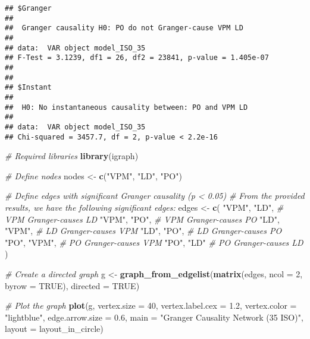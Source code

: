 \documentclass[
]{article}
\newenvironment{Shaded}{\begin{snugshade}}{\end{snugshade}}
\newcommand{\AttributeTok}[1]{\textcolor[rgb]{0.13,0.29,0.53}{#1}}
\newcommand{\CommentTok}[1]{\textcolor[rgb]{0.56,0.35,0.01}{\textit{#1}}}
\newcommand{\ConstantTok}[1]{\textcolor[rgb]{0.56,0.35,0.01}{#1}}
\newcommand{\DecValTok}[1]{\textcolor[rgb]{0.00,0.00,0.81}{#1}}
\newcommand{\FloatTok}[1]{\textcolor[rgb]{0.00,0.00,0.81}{#1}}
\newcommand{\FunctionTok}[1]{\textcolor[rgb]{0.13,0.29,0.53}{\textbf{#1}}}
\newcommand{\NormalTok}[1]{#1}
\newcommand{\OtherTok}[1]{\textcolor[rgb]{0.56,0.35,0.01}{#1}}
\newcommand{\StringTok}[1]{\textcolor[rgb]{0.31,0.60,0.02}{#1}}
\begin{document}
\begin{verbatim}
## $Granger
## 
##  Granger causality H0: PO do not Granger-cause VPM LD
## 
## data:  VAR object model_ISO_35
## F-Test = 3.1239, df1 = 26, df2 = 23841, p-value = 1.405e-07
## 
## 
## $Instant
## 
##  H0: No instantaneous causality between: PO and VPM LD
## 
## data:  VAR object model_ISO_35
## Chi-squared = 3457.7, df = 2, p-value < 2.2e-16
\end{verbatim}

\begin{Shaded}
\begin{Highlighting}[]
\CommentTok{\# Required libraries}
\FunctionTok{library}\NormalTok{(igraph)}

\CommentTok{\# Define nodes}
\NormalTok{nodes }\OtherTok{\textless{}{-}} \FunctionTok{c}\NormalTok{(}\StringTok{"VPM"}\NormalTok{, }\StringTok{"LD"}\NormalTok{, }\StringTok{"PO"}\NormalTok{)}

\CommentTok{\# Define edges with significant Granger causality (p \textless{} 0.05)}
\CommentTok{\# From the provided results, we have the following significant edges:}
\NormalTok{edges }\OtherTok{\textless{}{-}} \FunctionTok{c}\NormalTok{(}
  \StringTok{"VPM"}\NormalTok{, }\StringTok{"LD"}\NormalTok{,  }\CommentTok{\# VPM Granger{-}causes LD}
  \StringTok{"VPM"}\NormalTok{, }\StringTok{"PO"}\NormalTok{,  }\CommentTok{\# VPM Granger{-}causes PO}
  \StringTok{"LD"}\NormalTok{, }\StringTok{"VPM"}\NormalTok{,  }\CommentTok{\# LD Granger{-}causes VPM}
  \StringTok{"LD"}\NormalTok{, }\StringTok{"PO"}\NormalTok{,   }\CommentTok{\# LD Granger{-}causes PO}
  \StringTok{"PO"}\NormalTok{, }\StringTok{"VPM"}\NormalTok{,  }\CommentTok{\# PO Granger{-}causes VPM}
  \StringTok{"PO"}\NormalTok{, }\StringTok{"LD"}    \CommentTok{\# PO Granger{-}causes LD}
\NormalTok{)}

\CommentTok{\# Create a directed graph}
\NormalTok{g }\OtherTok{\textless{}{-}} \FunctionTok{graph\_from\_edgelist}\NormalTok{(}\FunctionTok{matrix}\NormalTok{(edges, }\AttributeTok{ncol =} \DecValTok{2}\NormalTok{, }\AttributeTok{byrow =} \ConstantTok{TRUE}\NormalTok{), }\AttributeTok{directed =} \ConstantTok{TRUE}\NormalTok{)}

\CommentTok{\# Plot the graph}
\FunctionTok{plot}\NormalTok{(g,}
     \AttributeTok{vertex.size =} \DecValTok{40}\NormalTok{,}
     \AttributeTok{vertex.label.cex =} \FloatTok{1.2}\NormalTok{,}
     \AttributeTok{vertex.color =} \StringTok{"lightblue"}\NormalTok{,}
     \AttributeTok{edge.arrow.size =} \FloatTok{0.6}\NormalTok{,}
     \AttributeTok{main =} \StringTok{"Granger Causality Network (35 ISO)"}\NormalTok{,}
     \AttributeTok{layout =}\NormalTok{ layout\_in\_circle)}
\end{Highlighting}
\end{Shaded}
\end{document}

